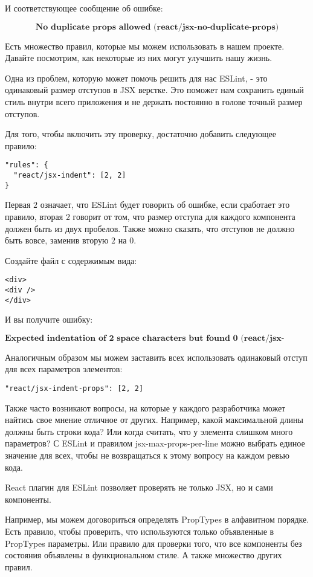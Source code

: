 \documentclass[12pt]{book}
\begin{document}
И соответствующее сообщение об ошибке:

$$
\textbf{No duplicate props allowed (react/jsx-no-duplicate-props)}
$$

Есть множество правил, которые мы можем использовать в нашем проекте. Давайте посмотрим, как некоторые из них могут улучшить нашу жизнь.

Одна из проблем, которую может помочь решить для нас ESLint, - это одинаковый размер отступов в JSX верстке. Это поможет нам сохранить единый стиль внутри всего приложения и не держать постоянно в голове точный размер отступов.

Для того, чтобы включить эту проверку, достаточно добавить следующее правило:

\begin{lstlisting}
"rules": {
  "react/jsx-indent": [2, 2]
}
\end{lstlisting}

Первая $2$ означает, что ESLint будет говорить об ошибке, если сработает это правило, вторая $2$ говорит от том, что размер отступа для каждого компонента должен быть из двух пробелов. Также можно сказать, что отступов не должно быть вовсе, заменив вторую $2$ на $0$.

Создайте файл с содержимым вида:

\begin{lstlisting}
<div>
<div />
</div>
\end{lstlisting}

И вы получите ошибку:

$$
\textbf{Expected indentation of 2 space characters but found 0 (react/jsx-indent)}
$$

Аналогичным образом мы можем заставить всех использовать одинаковый отступ для всех параметров элементов:

\begin{lstlisting}
"react/jsx-indent-props": [2, 2]
\end{lstlisting}

Также часто возникают вопросы, на которые у каждого разработчика может найтись свое мнение отличное от других. Например, какой максимальной длины должны быть строки кода? Или когда считать, что у элемента слишком много параметров? С ESLint и правилом jsx-max-props-per-line можно выбрать единое значение для всех, чтобы не возвращаться к этому вопросу на каждом ревью кода.

React плагин для ESLint позволяет проверять не только JSX, но и сами компоненты. 

Например, мы можем договориться определять PropTypes в алфавитном порядке. Есть правило, чтобы проверить, что используются только объявленные в PropTypes параметры. Или правило для проверки того, что все компоненты без состояния объявлены в функциональном стиле. А также множество других правил.
\end{document}
